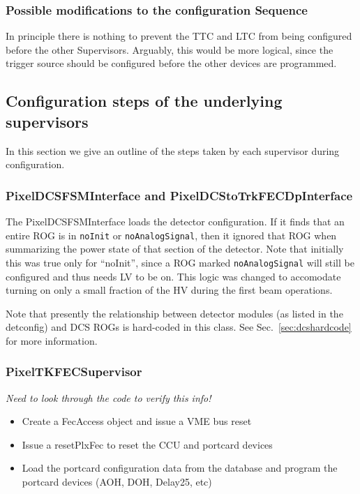 \subsubsection{Possible modifications to the configuration Sequence}

In principle there is nothing to prevent the TTC and LTC from being
configured before the other Supervisors. Arguably, this would be more logical, since the trigger source
should be configured before the other devices are programmed.

\subsection{Configuration steps of the underlying supervisors}
In this section we give an outline of the steps taken by each supervisor during configuration.

\subsubsection{PixelDCSFSMInterface and PixelDCStoTrkFECDpInterface}

The PixelDCSFSMInterface loads the detector configuration. If it finds
that an entire ROG is in {\tt noInit} or {\tt noAnalogSignal}, then it
ignored that ROG when summarizing the power state of that section of
the detector. Note that initially this was true only for ``noInit'',
since a ROG marked {\tt noAnalogSignal} will still be configured and
thus needs LV to be on. This logic was changed to accomodate turning
on only a small fraction of the HV during the first beam operations.

Note that presently the relationship between detector modules (as
listed in the detconfig) and DCS ROGs is hard-coded in this class. See
Sec.~\ref{sec:dcshardcode} for more information.

\subsubsection{PixelTKFECSupervisor}

{\it Need to look through the code to verify this info!}
\begin{itemize}
\item Create a FecAccess object and issue a VME bus reset
\item Issue a resetPlxFec to reset the CCU and portcard devices
\item Load the portcard configuration data from the database and program the portcard devices (AOH, DOH, Delay25, etc)
\end{itemize}

